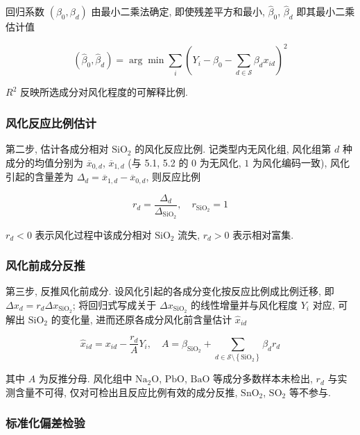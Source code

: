 \documentclass{ctexart}
\begin{document}
回归系数 $\left(\beta_0,\beta_d\right)$ 由最小二乘法确定, 即使残差平方和最小, $\widehat{\beta}_0$, $\widehat{\beta}_d$ 即其最小二乘估计值

\begin{equation*}
\left(\widehat\beta_{0},\widehat\beta_{d}\right)=\arg\min\sum_{i}\left(Y_i-\beta_{0}-\sum_{d\in\mathcal{S}}\beta_{d}x_{id}\right)^{2}
\end{equation*}

$R^2$ 反映所选成分对风化程度的可解释比例.


\subsubsection{风化反应比例估计}

第二步, 估计各成分相对 $\mathrm{SiO_2}$ 的风化反应比例. 记类型内无风化组, 风化组第 $d$ 种成分的均值分别为 $\overline{x}_{0,d}$, $\overline{x}_{1,d}$ (与 5.1, 5.2 的 $0$ 为无风化, $1$ 为风化编码一致), 风化引起的含量差为 $\Delta_{d}=\overline{x}_{1,d}-\overline{x}_{0,d}$, 则反应比例

\begin{equation*}
r_{d}=\frac{\Delta_{d}}{\Delta_{\mathrm{SiO_2}}},\quad{}r_{\mathrm{SiO_2}}=1
\end{equation*}

$r_{d}<0$ 表示风化过程中该成分相对 $\mathrm{SiO_2}$ 流失, $r_{d}>0$ 表示相对富集.


\subsubsection{风化前成分反推}

第三步, 反推风化前成分. 设风化引起的各成分变化按反应比例成比例迁移, 即 $\Delta{}x_{d}=r_{d}\Delta{}x_{\mathrm{SiO_2}}$; 将回归式写成关于 $\Delta{}x_{\mathrm{SiO_2}}$ 的线性增量并与风化程度 $Y_i$ 对应, 可解出 $\mathrm{SiO_2}$ 的变化量, 进而还原各成分风化前含量估计 $\widehat{x}_{id}$

\begin{equation*}
\widehat{x}_{id}=x_{id}-\frac{r_{d}}{A}Y_i,\quad{}A=\beta_{\mathrm{SiO_2}}+\sum_{d\in\mathcal{S}\setminus\left\{\mathrm{SiO_2}\right\}}\beta_{d}r_{d}
\end{equation*}

其中 $A$ 为反推分母. 风化组中 $\mathrm{Na_2O}$, $\mathrm{PbO}$, $\mathrm{BaO}$ 等成分多数样本未检出, $r_d$ 与实测含量不可得, 仅对可检出且反应比例有效的成分反推, $\mathrm{SnO_2}$, $\mathrm{SO_2}$ 等不参与.


\subsubsection{标准化偏差检验}
\end{document}
